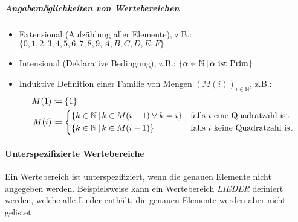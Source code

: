 			\subparagraph{Angabemöglichkeiten von Wertebereichen}
				\begin{itemize}
					\item Extensional (Aufzählung aller Elemente), z.B.: $ \{ 0, 1, 2, 3, 4, 5, 6, 7, 8, 9, A, B, C, D, E, F \} $
					\item Intensional (Deklarative Bedingung), z.B.: $ \{ \alpha \in \mathbb{N} \,\vert\, \alpha \text{ ist Prim} \} $
					\item Induktive Definition einer Familie von Mengen $ (M(i)) _ { i \in \mathbb{N} } $, z.B.:
						\begin{align*}
							M(1) & \coloneqq \{ 1 \}                                                                                               \\
							M(i) & \coloneqq \begin{cases*}
								                 \{ k \in \mathbb{N} \forwhich k \in M(i - 1) \lor k = i \} & \text{falls $ i $ eine Quadratzahl ist}  \\
								                 \{ k \in \mathbb{N} \forwhich k \in M(i - 1) \}            & \text{falls $ i $ keine Quadratzahl ist} \\
							                 \end{cases*} \\
						\end{align*}
				\end{itemize}



		\paragraph{Unterspezifizierte Wertebereiche}
			Ein Wertebereich ist unterspezifiziert, wenn die genauen Elemente nicht angegeben werden. Beispielsweise kann ein Wertebereich \textit{LIEDER} definiert werden, welche alle Lieder enthält, die genauen Elemente werden aber nicht gelistet

